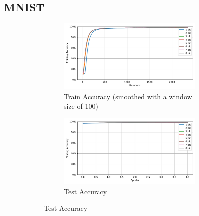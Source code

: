     \subsection{MNIST}
    \label{appendix:accuracy_curves_mnist}
        \begin{figure}[H]
            \centering
            \begin{subfigure}[H]{0.69\textwidth}
                \centering
                \begin{subfigure}[H]{\textwidth}
                    \centering
                    \includegraphics[width=\textwidth]{../standard/MNIST/plots/mnist_train_acc.pdf}
                    \caption{Train Accuracy (smoothed with a window size of 100)}
                \end{subfigure}
                \hfill
                \begin{subfigure}[H]{\textwidth}
                    \centering
                    \includegraphics[width=\textwidth]{../standard/MNIST/plots/mnist_test_acc.pdf}
                    \caption{Test Accuracy}
                \end{subfigure}
            \end{subfigure}
            \hfill
            \begin{subfigure}[H]{0.3\textwidth}

\end{subfigure}
\end{figure}
